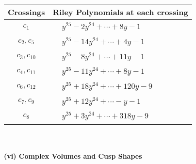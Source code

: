 \documentclass[1p]{elsarticle_modified}
\theoremstyle{definition}
\begin{document}
\begin{tabular}{m{50pt}|m{274pt}}
Crossings & \hspace{64pt}Riley Polynomials at each crossing \\
\hline $$\begin{aligned}c_{1}\end{aligned}$$&$\begin{aligned}
&y^{25}-2 y^{24}+\cdots+8 y-1
\end{aligned}$\\
\hline $$\begin{aligned}c_{2},c_{5}\end{aligned}$$&$\begin{aligned}
&y^{25}-14 y^{24}+\cdots+4 y-1
\end{aligned}$\\
\hline $$\begin{aligned}c_{3},c_{10}\end{aligned}$$&$\begin{aligned}
&y^{25}-8 y^{24}+\cdots+11 y-1
\end{aligned}$\\
\hline $$\begin{aligned}c_{4},c_{11}\end{aligned}$$&$\begin{aligned}
&y^{25}-11 y^{24}+\cdots+8 y-1
\end{aligned}$\\
\hline $$\begin{aligned}c_{6},c_{12}\end{aligned}$$&$\begin{aligned}
&y^{25}+18 y^{24}+\cdots+120 y-9
\end{aligned}$\\
\hline $$\begin{aligned}c_{7},c_{9}\end{aligned}$$&$\begin{aligned}
&y^{25}+12 y^{24}+\cdots- y-1
\end{aligned}$\\
\hline $$\begin{aligned}c_{8}\end{aligned}$$&$\begin{aligned}
&y^{25}+3 y^{24}+\cdots+318 y-9
\end{aligned}$\\
\hline
\end{tabular}\\~\\
\newpage\flushleft \textbf{(vi) Complex Volumes and Cusp Shapes}
\end{document}
